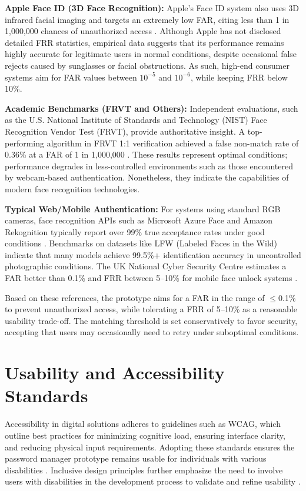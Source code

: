 \textbf{Apple Face ID (3D Face Recognition):} Apple's Face ID system also uses 3D infrared facial imaging and targets an extremely low FAR, citing less than 1 in 1{,}000{,}000 chances of unauthorized access \autocite{BentoFaceID}. Although Apple has not disclosed detailed FRR statistics, empirical data suggests that its performance remains highly accurate for legitimate users in normal conditions, despite occasional false rejects caused by sunglasses or facial obstructions. As such, high-end consumer systems aim for FAR values between $10^{-5}$ and $10^{-6}$, while keeping FRR below 10\%.

\clearpage
\textbf{Academic Benchmarks (FRVT and Others):} Independent evaluations, such as the U.S. National Institute of Standards and Technology (NIST) Face Recognition Vendor Test (FRVT), provide authoritative insight. A top-performing algorithm in FRVT 1:1 verification achieved a false non-match rate of 0.36\% at a FAR of 1 in 1{,}000{,}000 \autocite{ParavisionFRVT}. These results represent optimal conditions; performance degrades in less-controlled environments such as those encountered by webcam-based authentication. Nonetheless, they indicate the capabilities of modern face recognition technologies.

\textbf{Typical Web/Mobile Authentication:} For systems using standard RGB cameras, face recognition APIs such as Microsoft Azure Face and Amazon Rekognition typically report over 99\% true acceptance rates under good conditions \autocite{IJCAFace}. Benchmarks on datasets like LFW (Labeled Faces in the Wild) indicate that many models achieve 99.5\%+ identification accuracy in uncontrolled photographic conditions. The UK National Cyber Security Centre estimates a FAR better than 0.1\% and FRR between 5--10\% for mobile face unlock systems \autocite{BentoFaceID,MicrosoftHelloDocs}.

Based on these references, the prototype aims for a FAR in the range of $\leq$0.1\% to prevent unauthorized access, while tolerating a FRR of 5--10\% as a reasonable usability trade-off. The matching threshold is set conservatively to favor security, accepting that users may occasionally need to retry under suboptimal conditions.

\section{Usability and Accessibility Standards}
Accessibility in digital solutions adheres to guidelines such as WCAG, which outline best practices for minimizing cognitive load, ensuring interface clarity, and reducing physical input requirements. Adopting these standards ensures the password manager prototype remains usable for individuals with various disabilities \autocite{Brewer2023}. Inclusive design principles further emphasize the need to involve users with disabilities in the development process to validate and refine usability \autocite{Lazar2015}.
